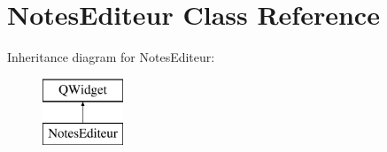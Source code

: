 \hypertarget{class_notes_editeur}{}\section{Notes\+Editeur Class Reference}
\label{class_notes_editeur}
Inheritance diagram for Notes\+Editeur\+:\begin{figure}[H]
\begin{center}
\leavevmode
\includegraphics[height=2.000000cm]{class_notes_editeur}
\end{center}
\end{figure}
